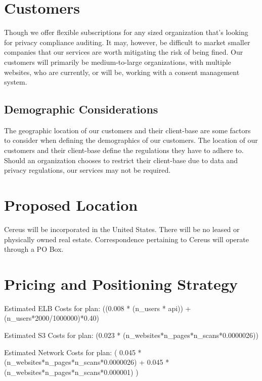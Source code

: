 
\section{Customers}

Though we offer flexible subscriptions for any sized organization that's looking for privacy compliance auditing. It may, however, be difficult to market smaller companies that our services are worth mitigating the risk of being fined. Our customers will primarily be medium-to-large organizations, with multiple websites, who are currently, or will be, working with a consent management system.

\subsection{Demographic Considerations}

The geographic location of our customers and their client-base are some factors to consider when defining the demographics of our customers. The location of our customers and their client-base define the regulations they have to adhere to. Should an organization chooses to restrict their client-base due to data and privacy regulations, our services may not be required.


\section{Proposed Location}

Cereus will be incorporated in the United States. There will be no leased or physically owned real estate. Correspondence pertaining to Cereus will operate through a PO Box. 


\section{Pricing and Positioning Strategy}

Estimated ELB Costs for plan:
((0.008 * (n_users * api)) + (n_users*2000/1000000)*0.40)

Estimated S3 Costs for plan:
(0.023 * (n_websites*n_pages*n_scans*0.0000026))

Estimated Network Costs for plan:
(
  0.045 * (n_websites*n_pages*n_scans*0.0000026) +
  0.045 * (n_websites*n_pages*n_scans*0.000001)
)


